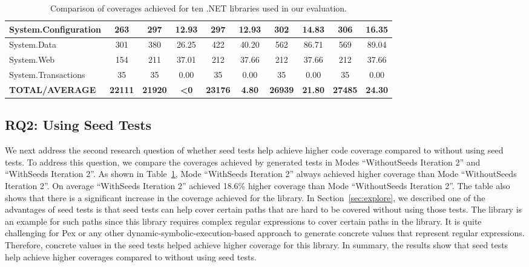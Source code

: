 \begin{table}[t]
\begin{SmallOut}
\begin{CodeOut}
\begin{center}
\begin {tabular} {|l|c|c|c|c|c|c|c|c|c|}
\hline  System.Configuration 	& 263 		& 297 	& 12.93		& 297		& 12.93	& 302		& 14.83		& 306		& 16.35 				\\
\hline  System.Data 					& 301 		& 380		& 26.25		& 422		& 40.20	& 562		& 86.71		& 569		& 89.04 				\\
\hline  System.Web 						& 154			& 211		& 37.01		& 212		& 37.66	& 212		& 37.66		& 212		& 37.66 				\\
\hline  System.Transactions 	& 35			& 35		& 0.00		& 35		& 0.00	& 35		& 0.00		& 35		& 0.00 					\\
\hline \textbf{TOTAL/AVERAGE} & \textbf{22111} & \textbf{21920} & \textbf{<0} & \textbf{23176} & \textbf{4.80} & \textbf{26939}	& \textbf{21.80} & \textbf{27485} & \textbf{24.30} \\
\hline
\end{tabular}
\end{center}
\end{CodeOut}
\end{SmallOut}
\centering \caption {\label{tab:detailedres}Comparison of coverages achieved for ten .NET libraries used in our evaluation.}
\end{table}

\subsection{RQ2: Using Seed Tests}

We next address the second research question of whether seed tests help achieve higher code coverage compared to without using seed tests. To address this question, we compare the coverages achieved by generated tests in Modes ``WithoutSeeds Iteration 2'' and ``WithSeeds Iteration 2''. As shown in Table~\ref{tab:detailedres}, Mode ``WithSeeds Iteration 2'' always achieved higher coverage than Mode ``WithoutSeeds Iteration 2''. On average ``WithSeeds Iteration 2'' achieved 18.6\% higher coverage than Mode ``WithoutSeeds Iteration 2''. The table also shows that there is a significant increase in the coverage achieved for the  library. 
In Section~\ref{sec:explore}, we described one of the advantages of seed tests is that seed tests can help cover certain paths that are hard to be covered without using those tests. The  library is an example for such paths since this library requires complex regular expressions to cover certain paths in the library. It is quite challenging for Pex or any other dynamic-symbolic-execution-based approach to generate concrete values that represent regular expressions. Therefore, concrete values in the seed tests helped achieve higher coverage for this library. In summary, the results show that seed tests help achieve higher coverages compared to without using seed tests.

